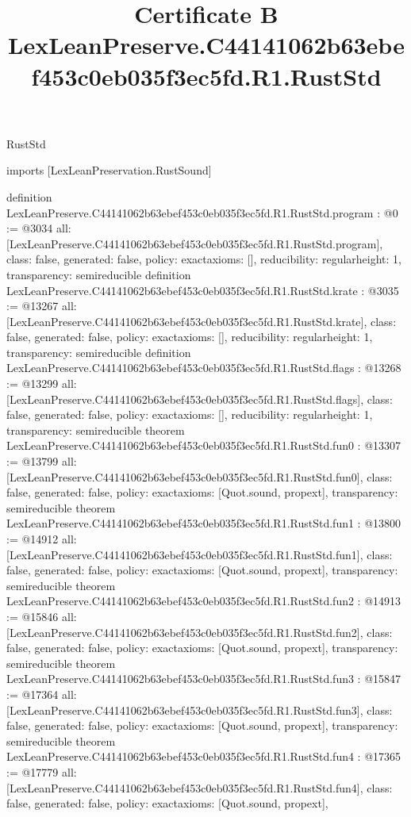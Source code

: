 \begin{lexlean}{RustStd}
\title{Certificate B LexLeanPreserve.C44141062b63ebef453c0eb035f3ec5fd.R1.RustStd}
\begin{coremodule}
imports [LexLeanPreservation.RustSound]

definition LexLeanPreserve.C44141062b63ebef453c0eb035f3ec5fd.R1.RustStd.program : @0 := @3034 {
  all: [LexLeanPreserve.C44141062b63ebef453c0eb035f3ec5fd.R1.RustStd.program],
  class: false,
  generated: false,
  policy: exact{axioms: []},
  reducibility: regular{height: 1},
  transparency: semireducible
}
definition LexLeanPreserve.C44141062b63ebef453c0eb035f3ec5fd.R1.RustStd.krate : @3035 := @13267 {
  all: [LexLeanPreserve.C44141062b63ebef453c0eb035f3ec5fd.R1.RustStd.krate],
  class: false,
  generated: false,
  policy: exact{axioms: []},
  reducibility: regular{height: 1},
  transparency: semireducible
}
definition LexLeanPreserve.C44141062b63ebef453c0eb035f3ec5fd.R1.RustStd.flags : @13268 := @13299 {
  all: [LexLeanPreserve.C44141062b63ebef453c0eb035f3ec5fd.R1.RustStd.flags],
  class: false,
  generated: false,
  policy: exact{axioms: []},
  reducibility: regular{height: 1},
  transparency: semireducible
}
theorem LexLeanPreserve.C44141062b63ebef453c0eb035f3ec5fd.R1.RustStd.fun0 : @13307 := @13799 {
  all: [LexLeanPreserve.C44141062b63ebef453c0eb035f3ec5fd.R1.RustStd.fun0],
  class: false,
  generated: false,
  policy: exact{axioms: [Quot.sound, propext]},
  transparency: semireducible
}
theorem LexLeanPreserve.C44141062b63ebef453c0eb035f3ec5fd.R1.RustStd.fun1 : @13800 := @14912 {
  all: [LexLeanPreserve.C44141062b63ebef453c0eb035f3ec5fd.R1.RustStd.fun1],
  class: false,
  generated: false,
  policy: exact{axioms: [Quot.sound, propext]},
  transparency: semireducible
}
theorem LexLeanPreserve.C44141062b63ebef453c0eb035f3ec5fd.R1.RustStd.fun2 : @14913 := @15846 {
  all: [LexLeanPreserve.C44141062b63ebef453c0eb035f3ec5fd.R1.RustStd.fun2],
  class: false,
  generated: false,
  policy: exact{axioms: [Quot.sound, propext]},
  transparency: semireducible
}
theorem LexLeanPreserve.C44141062b63ebef453c0eb035f3ec5fd.R1.RustStd.fun3 : @15847 := @17364 {
  all: [LexLeanPreserve.C44141062b63ebef453c0eb035f3ec5fd.R1.RustStd.fun3],
  class: false,
  generated: false,
  policy: exact{axioms: [Quot.sound, propext]},
  transparency: semireducible
}
theorem LexLeanPreserve.C44141062b63ebef453c0eb035f3ec5fd.R1.RustStd.fun4 : @17365 := @17779 {
  all: [LexLeanPreserve.C44141062b63ebef453c0eb035f3ec5fd.R1.RustStd.fun4],
  class: false,
  generated: false,
  policy: exact{axioms: [Quot.sound, propext]},
}
\end{coremodule}
\end{lexlean}

